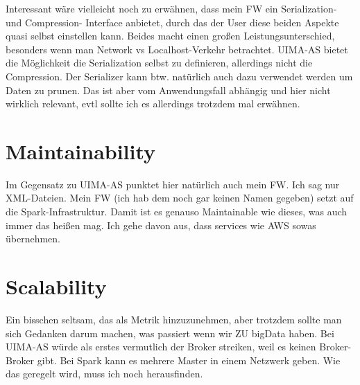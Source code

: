 Interessant wäre vielleicht noch zu erwähnen, dass mein FW ein Serialization- und Compression- Interface anbietet, durch das der User diese beiden Aspekte quasi selbst einstellen kann. Beides macht einen großen Leistungsunterschied, besonders wenn man Network vs Localhost-Verkehr betrachtet. UIMA-AS bietet die Möglichkeit die Serialization selbst zu definieren, allerdings nicht die Compression. Der Serializer kann btw. natürlich auch dazu verwendet werden um Daten zu prunen. Das ist aber vom Anwendungsfall abhängig und hier nicht wirklich relevant, evtl sollte ich es allerdings trotzdem mal erwähnen.

\section{Maintainability}

Im Gegensatz zu UIMA-AS punktet hier natürlich auch mein FW. Ich sag nur XML-Dateien.
Mein FW (ich hab dem noch gar keinen Namen gegeben) setzt auf die Spark-Infrastruktur. Damit ist es genauso Maintainable wie dieses, was auch immer das heißen mag. Ich gehe davon aus, dass services wie AWS sowas übernehmen.

\section{Scalability}

Ein bisschen seltsam, das als Metrik hinzuzunehmen, aber trotzdem sollte man sich Gedanken darum machen, was passiert wenn wir ZU bigData haben. Bei UIMA-AS würde als erstes vermutlich der Broker streiken, weil es keinen Broker-Broker gibt. Bei Spark kann es mehrere Master in einem Netzwerk geben. Wie das geregelt wird, muss ich noch herausfinden.